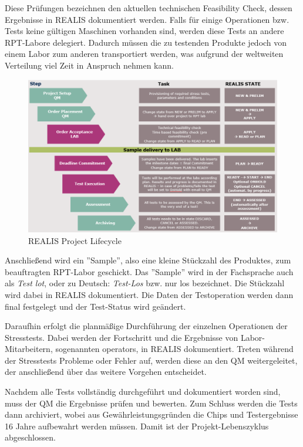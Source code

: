 Diese Prüfungen bezeichnen den aktuellen technischen Feasibility Check, dessen Ergebnisse in \gls{REALIS} dokumentiert werden.
Falls für einige Operationen bzw. Tests keine gültigen Maschinen vorhanden sind, werden diese Tests an andere \gls{RPT}-Labore delegiert. Dadurch müssen die zu testenden Produkte jedoch von einem Labor zum anderen transportiert werden, was aufgrund der weltweiten Verteilung viel Zeit in Anspruch nehmen kann.

\begin{figure}[!h]
    \centering
    \includegraphics[width=1\textwidth]{bilder/realis-project-lifecycle.png}
    \caption{REALIS Project Lifecycle \cite{REALISWikiIntern}}
    \label{fig:realis-project-lifecycle}
\end{figure}

Anschließend wird ein ''Sample'', also eine kleine Stückzahl des Produktes, zum beauftragten \gls{RPT}-Labor geschickt. Das ''Sample'' wird in der Fachsprache auch als \textit{Test lot}, oder zu Deutsch: \textit{Test-Los} bzw. nur \gls{los} bezeichnet. Die Stückzahl wird dabei in \gls{REALIS} dokumentiert. Die  Daten der Testoperation werden dann final festgelegt und der Test-Status wird geändert.

Daraufhin erfolgt die planmäßige Durchführung der einzelnen Operationen der Stresstests. Dabei werden der Fortschritt und die Ergebnisse von Labor-Mitarbeitern, sogenannten \glspl{operator}, in \gls{REALIS} dokumentiert. Treten während der Stresstests Probleme oder Fehler auf, werden diese an den \gls{QM} weitergeleitet, der anschließend über das weitere Vorgehen entscheidet.

Nachdem alle Tests vollständig durchgeführt und dokumentiert worden sind, muss der \gls{QM} die Ergebnisse prüfen und bewerten. Zum Schluss werden die Tests dann archiviert, wobei aus Gewährleistungsgründen die Chips und Testergebnisse 16 Jahre aufbewahrt werden müssen. Damit ist der Projekt-Lebenszyklus abgeschlossen.

